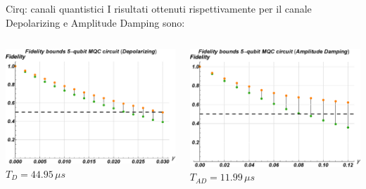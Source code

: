\documentclass{beamer}
\renewcommand{\'}[0]{\`}
\begin{document}
	\begin{frame}{Cirq: canali quantistici}
	I risultati ottenuti rispettivamente per il canale \alert{Depolarizing} e \alert{Amplitude Damping} sono:
	\vspace{0.5cm}
	
	\begin{columns}
	
\centering \includegraphics[width=1\textwidth]{./image/Dep_p.eps}	
\vspace{0.3cm}
 $T_D=44.95\, \mu s$

\centering \includegraphics[width=1\textwidth]{./image/Amp_gamma.eps}
\vspace{0.3cm}
 $T_{AD}=11.99\, \mu s$
	\end{columns}
	
	


	
	\end{frame}
	
\end{document}
